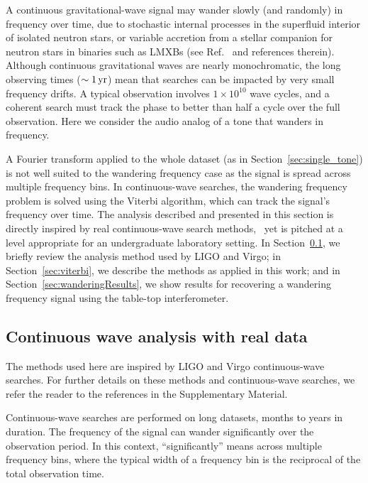 \documentclass[paper-main.tex]{subfiles}
\begin{document}
A continuous gravitational-wave signal may wander slowly (and randomly) in frequency over time, due to stochastic internal processes in the superfluid interior of isolated neutron stars, or variable accretion from a stellar companion for neutron stars in binaries such as LMXBs (see Ref.~\cite{SuvorovaEtAl:2017} and references therein).
Although continuous gravitational waves are nearly monochromatic, the long observing times ($\sim 1\,{\rm yr}$) mean that searches can be impacted by very small frequency drifts. 
A typical observation involves $1 \times 10^{10}$ wave cycles, and a coherent search must track the phase to better than half a cycle over the full observation. 
Here we consider the audio analog of a tone that wanders in frequency. 


A Fourier transform applied to the whole dataset (as in Section~\ref{sec:single_tone}) is not well suited to the wandering frequency case as the signal is spread across multiple frequency bins. 
In continuous-wave searches, the wandering frequency problem is solved using the Viterbi algorithm,\cite{Viterbi:1967} which can track the signal's frequency over time.
The analysis described and presented in this section is directly inspired by real continuous-wave search methods,~\cite{SuvorovaEtAl:2017} yet is pitched at a level appropriate for an undergraduate laboratory setting. 
In Section~\ref{sec:realCWSearches}, we briefly review the analysis method used by LIGO and Virgo; in Section~\ref{sec:viterbi}, we describe the methods as applied in this work; and in Section~\ref{sec:wanderingResults}, we show results for recovering a wandering frequency signal using the table-top interferometer. 


\subsection{Continuous wave analysis with real data}
\label{sec:realCWSearches}

The methods used here are inspired by LIGO and Virgo continuous-wave searches. 
For further details on these methods and continuous-wave searches, we refer the reader to the references in the Supplementary Material. 


Continuous-wave searches are performed on long datasets, months to years in duration. 
The frequency of the signal can wander significantly over the observation period. 
In this context, ``significantly'' means across multiple frequency bins, where the typical width of a frequency bin is the reciprocal of the total observation time.\cite{JKS:1998,ScoX1O2Viterbi:2019}
\end{document}

